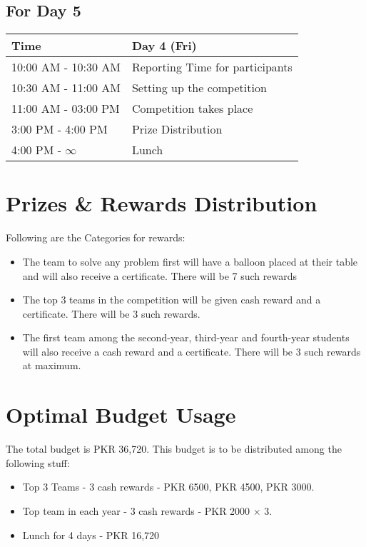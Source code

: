 \documentclass[12pt]{article}
\begin{document}
\subsection*{\centering For Day 5}
\begin{table}[H]
    \centering
    \begin{tabular}{|p{2.1cm}|p{12.9cm}|}
        \hline
        Time                & Day 4 (Fri)                     \\
        \hline
        10:00 AM - 10:30 AM & Reporting Time for participants \\
        \hline
        10:30 AM - 11:00 AM & Setting up the competition      \\
        \hline
        11:00 AM - 03:00 PM & Competition takes place         \\
        \hline
        3:00 PM - 4:00 PM   & Prize Distribution              \\
        \hline
        4:00 PM - $\infty$  & Lunch                           \\
        \hline
    \end{tabular}
\end{table}

\section*{\centering Prizes \& Rewards Distribution}
Following are the Categories for rewards:
\begin{itemize}
    \item The team to solve any problem first will have a balloon placed at their table and will also receive a certificate. There will be 7 such rewards
    \item The top 3 teams in the competition will be given cash reward and a certificate. There will be 3 such rewards.
    \item The first team among the second-year, third-year and fourth-year students will also receive a cash reward and a certificate. There will be 3 such rewards at maximum.

\end{itemize}
\section*{\centering Optimal Budget Usage}
The total budget is PKR 36,720.
This budget is to be distributed among the following stuff:
\begin{itemize}
    \item Top 3 Teams - 3 cash rewards - PKR 6500, PKR 4500, PKR 3000.
    \item Top team in each year - 3 cash rewards - PKR 2000 $\times$ 3.
    \item Lunch for 4 days - PKR 16,720
\end{itemize}
\end{document}
